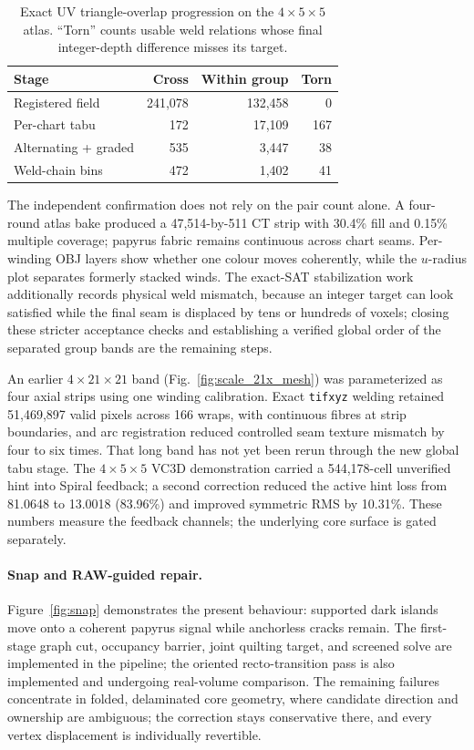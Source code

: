 \begin{table}[t]
  \caption{Exact UV triangle-overlap progression on the $4\times5\times5$ atlas. ``Torn'' counts usable weld relations whose final integer-depth difference misses its target.}
  \label{tab:tabu}
  \centering
  \small
  \begin{tabular}{@{}lrrr@{}}
    \toprule
    Stage & Cross & Within group & Torn \\
    \midrule
    Registered field & 241,078 & 132,458 & 0 \\
    Per-chart tabu & 172 & 17,109 & 167 \\
    Alternating + graded & 535 & 3,447 & 38 \\
    Weld-chain bins & 472 & 1,402 & 41 \\
    \bottomrule
  \end{tabular}
\end{table}

The independent confirmation does not rely on the pair count alone. A four-round atlas bake produced a 47,514-by-511 CT strip with 30.4\% fill and 0.15\% multiple coverage; papyrus fabric remains continuous across chart seams. Per-winding OBJ layers show whether one colour moves coherently, while the $u$-radius plot separates formerly stacked winds. The exact-SAT stabilization work additionally records physical weld mismatch, because an integer target can look satisfied while the final seam is displaced by tens or hundreds of voxels; closing these stricter acceptance checks and establishing a verified global order of the separated group bands are the remaining steps.

An earlier $4\times21\times21$ band (Fig.~\ref{fig:scale_21x_mesh}) was parameterized as four axial strips using one winding calibration. Exact \texttt{tifxyz} welding retained 51,469,897 valid pixels across 166 wraps, with continuous fibres at strip boundaries, and arc registration reduced controlled seam texture mismatch by four to six times. That long band has not yet been rerun through the new global tabu stage. The $4\times5\times5$ VC3D demonstration carried a 544,178-cell unverified hint into Spiral feedback; a second correction reduced the active hint loss from 81.0648 to 13.0018 (83.96\%) and improved symmetric RMS by 10.31\%. These numbers measure the feedback channels; the underlying core surface is gated separately.

\paragraph{Snap and RAW-guided repair.}
Figure~\ref{fig:snap} demonstrates the present behaviour: supported dark islands move onto a coherent papyrus signal while anchorless cracks remain. The first-stage graph cut, occupancy barrier, joint quilting target, and screened solve are implemented in the pipeline; the oriented recto-transition pass is also implemented and undergoing real-volume comparison. The remaining failures concentrate in folded, delaminated core geometry, where candidate direction and ownership are ambiguous; the correction stays conservative there, and every vertex displacement is individually revertible.

